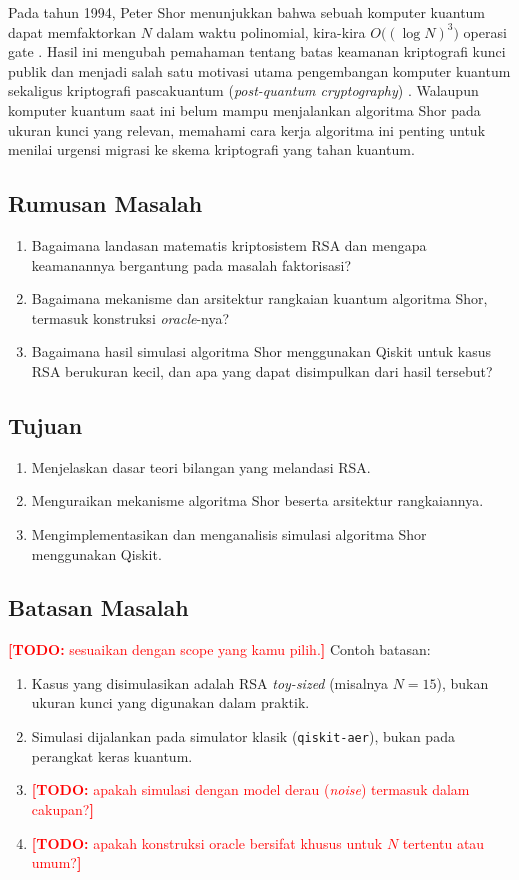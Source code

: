 \documentclass[11pt,a4paper]{article}
\newcommand{\todo}[1]{\textcolor{red}{\textbf{[TODO:} #1\textbf{]}}}
\begin{document}
Pada tahun 1994, Peter Shor menunjukkan bahwa sebuah komputer kuantum dapat
memfaktorkan $N$ dalam waktu polinomial, kira-kira $O\big((\log N)^3\big)$
operasi gate \cite{shor1997}. Hasil ini mengubah pemahaman tentang
batas keamanan kriptografi kunci publik dan menjadi salah satu motivasi utama
pengembangan komputer kuantum sekaligus kriptografi pascakuantum
(\emph{post-quantum cryptography}) \cite{nist_pqc}. Walaupun komputer kuantum
saat ini belum mampu menjalankan algoritma Shor pada ukuran kunci yang
relevan, memahami cara kerja algoritma ini penting untuk menilai urgensi
migrasi ke skema kriptografi yang tahan kuantum.

\subsection{Rumusan Masalah}
\begin{enumerate}[label=\arabic*.]
  \item Bagaimana landasan matematis kriptosistem RSA dan mengapa keamanannya
        bergantung pada masalah faktorisasi?
  \item Bagaimana mekanisme dan arsitektur rangkaian kuantum algoritma Shor,
        termasuk konstruksi \emph{oracle}-nya?
  \item Bagaimana hasil simulasi algoritma Shor menggunakan Qiskit untuk kasus
        RSA berukuran kecil, dan apa yang dapat disimpulkan dari hasil tersebut?
\end{enumerate}

\subsection{Tujuan}
\begin{enumerate}[label=\arabic*.]
  \item Menjelaskan dasar teori bilangan yang melandasi RSA.
  \item Menguraikan mekanisme algoritma Shor beserta arsitektur rangkaiannya.
  \item Mengimplementasikan dan menganalisis simulasi algoritma Shor
        menggunakan Qiskit.
\end{enumerate}

\subsection{Batasan Masalah}
\todo{sesuaikan dengan scope yang kamu pilih.} Contoh batasan:
\begin{enumerate}[label=\arabic*.]
  \item Kasus yang disimulasikan adalah RSA \emph{toy-sized}
        (misalnya $N = 15$), bukan ukuran kunci yang digunakan dalam praktik.
  \item Simulasi dijalankan pada simulator klasik (\texttt{qiskit-aer}), bukan
        pada perangkat keras kuantum.
  \item \todo{apakah simulasi dengan model derau (\emph{noise}) termasuk dalam cakupan?}
  \item \todo{apakah konstruksi oracle bersifat khusus untuk $N$ tertentu atau umum?}
\end{enumerate}
\end{document}
